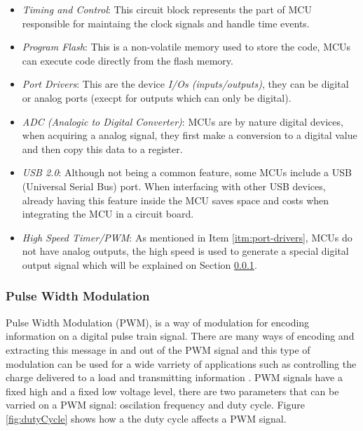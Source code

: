 		\begin{itemize}
			\item\textit{Timing and Control}: This circuit block represents the part of MCU responsible for maintaing the clock signals and handle time events.\label{itm:timing-and-control}
			\item\textit{Program Flash}: This is a non-volatile memory used to store the code, MCUs can execute code directly from the flash memory.\label{itm:program-flash}
			\item\textit{Port Drivers}: This are the device \textit{I/Os (inputs/outputs)}, they can be digital or analog ports (execpt for outputs which can only be digital).\label{itm:port-drivers}
			\item\textit{ADC (Analogic to Digital Converter)}: MCUs are by nature digital devices, when acquiring a analog signal, they first make a conversion to a digital value and then copy this data to a register.\label{itm:adc}
			\item\textit{USB 2.0}: Although not being a common feature, some MCUs include a USB (Universal Serial Bus) port. When interfacing with other USB devices, already having this feature inside the MCU saves space and costs when integrating the MCU in a circuit board.\label{itm:mcu-usb}
			\item\textit{High Speed Timer/PWM}: As mentioned in Item \ref{itm:port-drivers}, MCUs do not have analog outputs, the high speed is used to generate a special digital output signal which will be explained on Section \ref{ssec:mcu-pwm}.\label{itm:high-speed-timer-pwm}
		\end{itemize}

	\subsubsection{Pulse Width Modulation} \label{ssec:mcu-pwm}
	Pulse Width Modulation (PWM), is a way of modulation for encoding information on a digital pulse train signal. There are many ways of encoding and extracting this message in and out of the PWM signal and this type of modulation can be used for a wide varriety of applications such as controlling the charge delivered to a load and transmitting information \cite{standard19961037c}. PWM signals have a fixed high and a fixed low voltage level, there are two parameters that can be varried on a PWM signal: oscilation frequency and duty cycle. Figure \ref{fig:dutyCycle} shows how a the duty cycle affects a PWM signal. 

